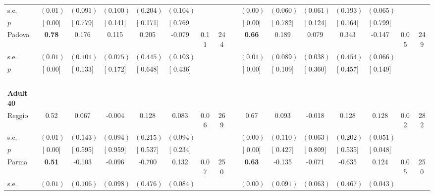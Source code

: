\begin{longtable}{L{8em} c c c c c c c p{1em} c c c c c c c}
\quad \quad \quad \quad s.e.& $ (     0.01)$ & $ (    0.091)$ & $ (    0.100)$ & $ (    0.204)$ & $ (    0.104)$ & & & & $ (     0.00)$ & $ (    0.060)$ & $ (    0.061)$ & $ (    0.193)$ & $ (    0.065)$ & &  \\*
\quad \quad \quad \quad $ p$ & [     0.00] & [    0.779] & [    0.141] & [    0.171] & [    0.769] & & & & [     0.00] & [    0.782] & [    0.124] & [    0.164] & [    0.799] & &  \\[1em]
\quad \quad \quad Padova& \textbf{     0.78} &     0.176 &     0.115 &     0.205 &    -0.079 &      0.11 &       244 & & \textbf{     0.66} &     0.189 &     0.079 &     0.343 &    -0.147 &      0.05 &       249  \\*
\quad \quad \quad \quad s.e.& $ (     0.01)$ & $ (    0.101)$ & $ (    0.075)$ & $ (    0.445)$ & $ (    0.103)$ & & & & $ (     0.01)$ & $ (    0.089)$ & $ (    0.038)$ & $ (    0.454)$ & $ (    0.066)$ & &  \\*
\quad \quad \quad \quad $ p$ & [     0.00] & [    0.133] & [    0.172] & [    0.648] & [    0.436] & & & & [     0.00] & [    0.109] & [    0.360] & [    0.457] & [    0.149] & &  \\[1em]
~\\[1em]
\quad \quad \textbf{Adult 40} & & & & & & & & & & & & & & & \\* 
\quad \quad \quad Reggio& 0.52 &     0.067 &    -0.004 &     0.128 &     0.083 &      0.06 &       269 & & 0.67 &     0.093 &    -0.018 &     0.128 & $ \mathbf{    0.128}$ &      0.02 &       282  \\*
\quad \quad \quad \quad s.e.& $ (     0.01)$ & $ (    0.143)$ & $ (    0.094)$ & $ (    0.215)$ & $ (    0.094)$ & & & & $ (     0.00)$ & $ (    0.110)$ & $ (    0.063)$ & $ (    0.202)$ & $ (    0.051)$ & &  \\*
\quad \quad \quad \quad $ p$ & [     0.00] & [    0.595] & [    0.959] & [    0.537] & [    0.234] & & & & [     0.00] & [    0.427] & [    0.809] & [    0.535] & [    0.048] & &  \\[1em]
\quad \quad \quad Parma& \textbf{     0.51} &    -0.103 &    -0.096 &    -0.700 &     0.132 &      0.07 &       250 & & \textbf{     0.63} &    -0.135 &    -0.071 &    -0.635 &     0.124 &      0.05 &       250  \\*
\quad \quad \quad \quad s.e.& $ (     0.01)$ & $ (    0.106)$ & $ (    0.098)$ & $ (    0.476)$ & $ (    0.084)$ & & & & $ (     0.00)$ & $ (    0.091)$ & $ (    0.063)$ & $ (    0.467)$ & $ (    0.043)$ & &  \\*

\end{longtable}
